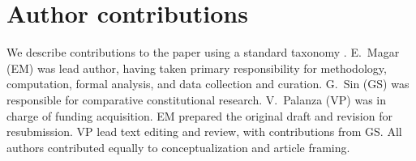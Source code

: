 \documentclass[letter,12pt]{article}
\begin{document}
\section*{Author contributions}

We describe contributions to the paper using a standard taxonomy \citep{allen2014credit}. E.\ Magar (EM) was lead author, having taken primary responsibility for methodology, computation, formal analysis, and data collection and curation. G.\ Sin (GS) was responsible for comparative constitutional research. V.\ Palanza (VP) was in charge of funding acquisition. EM prepared the original draft and revision for resubmission. VP lead text editing and review, with contributions from GS. All authors contributed equally to conceptualization and article framing. 








%
\end{document}
